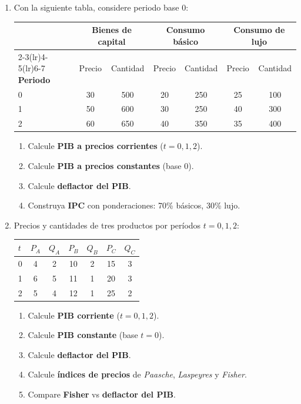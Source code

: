 \documentclass[11pt,addpoints]{article}
\begin{document}
\begin{enumerate}
\item Con la siguiente tabla, considere periodo base $0$:
\begin{center}
\setlength{\tabcolsep}{6pt}
\begin{tabular}{lcccccc}
\toprule
 & \multicolumn{2}{c}{\textbf{Bienes de capital}} & \multicolumn{2}{c}{\textbf{Consumo básico}} & \multicolumn{2}{c}{\textbf{Consumo de lujo}}\\
\cmidrule(lr){2-3}\cmidrule(lr){4-5}\cmidrule(lr){6-7}
\textbf{Periodo} & Precio & Cantidad & Precio & Cantidad & Precio & Cantidad\\
\midrule
0 & 30 & 500 & 20 & 250 & 25 & 100\\
1 & 50 & 600 & 30 & 250 & 40 & 300\\
2 & 60 & 650 & 40 & 350 & 35 & 400\\
\bottomrule
\end{tabular}
\end{center}
\begin{enumerate}[label=(\alph*)]
\item Calcule \textbf{PIB a precios corrientes} ($t=0,1,2$).
\item Calcule \textbf{PIB a precios constantes} (base $0$).
\item Calcule \textbf{deflactor del PIB}.
\item Construya \textbf{IPC} con ponderaciones: 70\% básicos, 30\% lujo.
\end{enumerate}


\newpage %
\vspace*{0.1cm} %

\item Precios y cantidades de tres productos por períodos $t=0,1,2$:
\begin{center}
\setlength{\tabcolsep}{6pt}
\begin{tabular}{lcccccc}
\toprule
$t$ & $P_A$ & $Q_A$ & $P_B$ & $Q_B$ & $P_C$ & $Q_C$\\
\midrule
0 & 4 & 2 & 10 & 2 & 15 & 3\\
1 & 6 & 5 & 11 & 1 & 20 & 3\\
2 & 5 & 4 & 12 & 1 & 25 & 2\\
\bottomrule
\end{tabular}
\end{center}
\begin{enumerate}[label=(\alph*)]
\item Calcule \textbf{PIB corriente} ($t=0,1,2$).
\item Calcule \textbf{PIB constante} (base $t=0$).
\item Calcule \textbf{deflactor del PIB}.
\item Calcule \textbf{índices de precios} de \textit{Paasche}, \textit{Laspeyres} y \textit{Fisher}.
\item Compare \textbf{Fisher} vs \textbf{deflactor del PIB}.
\end{enumerate}

\end{enumerate}
\end{document}
